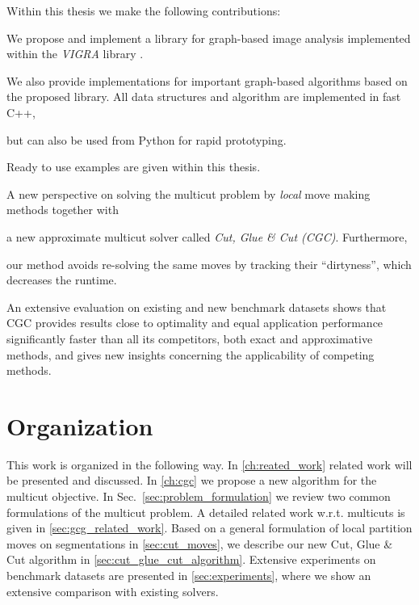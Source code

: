Within this thesis we make the following contributions:

\begin{inparaenum}[(i)]
    \item 
    We propose and implement a library for graph-based image analysis 
        implemented within the \emph{VIGRA} library \cite{koethe_2000_phd_thesis,software_vigra}. 
    \item 
        We also provide implementations for important graph-based algorithms based on the proposed library.
        All data structures and algorithm are implemented in fast C++,
    \item but can also be used from Python for rapid prototyping.
    \item Ready to use examples are given within this thesis.




    \item
      A new perspective on solving the multicut problem by
      \emph{local} move making methods together with
      \item
      a new approximate multicut solver called
      \emph{Cut, Glue \& Cut (CGC)}. Furthermore,
      \item our method avoids re-solving the same moves
      by tracking their ``dirtyness'', which decreases the runtime. 
      \item
      An extensive evaluation on existing and new benchmark datasets shows
      that CGC provides results close to optimality
      and equal application performance significantly faster than all its
      competitors, both exact
      and approximative methods, and gives new insights concerning the applicability
      of competing methods.
\end{inparaenum}




\section{Organization}

This work is organized in the following way.
In \cref{ch:reated_work} related work will be presented and  discussed.
In \cref{ch:cgc} we propose a new algorithm for the multicut objective.
In Sec.~\ref{sec:problem_formulation} we review two common formulations
of the multicut problem. 
A detailed related work w.r.t. multicuts is given in \cref{sec:gcg_related_work}.
Based on a general formulation of local partition moves on segmentations in
\cref{sec:cut_moves},
we describe our new Cut, Glue \& Cut algorithm
in \cref{sec:cut_glue_cut_algorithm}. Extensive experiments
on benchmark datasets are presented in \cref{sec:experiments},
where we show an extensive comparison  with existing solvers.

